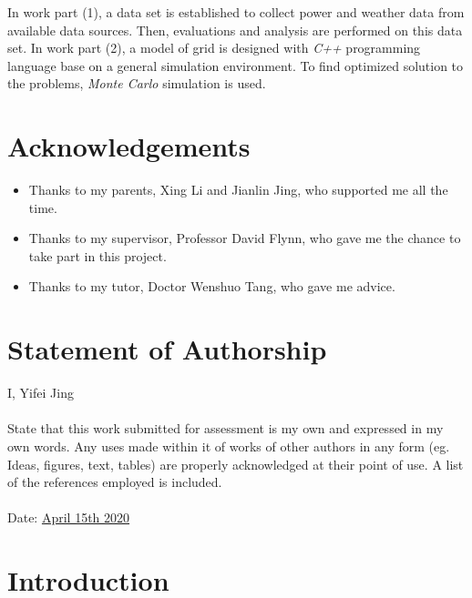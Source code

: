 \documentclass[12pt,a4paper]{report}
\begin{document}
        In work part (1), a data set is established to collect power and weather data from available data sources. Then, evaluations and analysis are performed on this data set.
        In work part (2), a model of grid is designed with \emph{C++} programming language base on a general simulation environment. To find optimized solution to the problems, \emph{Monte Carlo} simulation is used.

        
    \chapter*{Acknowledgements}
    \begin{itemize}
        \item Thanks to my parents, Xing Li and Jianlin Jing, who supported me all the time.

        \item Thanks to my supervisor, Professor David Flynn, who gave me the chance to take part in this project.

        \item Thanks to my tutor, Doctor Wenshuo Tang, who gave me advice.
    \end{itemize}

    \chapter*{Statement of Authorship}

        I, Yifei Jing \\ \\ 
        State that this work submitted for assessment is my own and expressed in my own words.
        Any uses made within it of works of other authors in any form (eg. Ideas, figures, text, tables)
        are properly acknowledged at their point of use. A list of the references employed is included.
        \\ \\Date: \underline{April 15th 2020}
    \chapter{Introduction}
\end{document}
